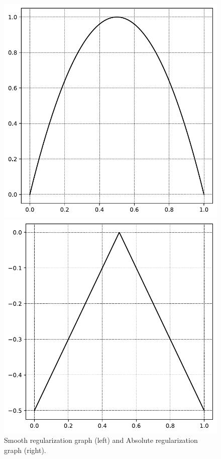 \begin{figure}[H]
    \centering
    \begin{minipage}{0.49\linewidth}
        \centering
        \includegraphics[width=\linewidth]{images/regularization/smooth_regularizer_graph.pdf}
    \end{minipage}%
    \begin{minipage}{0.49\linewidth}
        \centering
        \includegraphics[width=\linewidth]{images/regularization/abs_regularizer_graph.pdf}
    \end{minipage}
    \caption{Smooth regularization graph (left) and Absolute regularization graph (right).}
    \label{fig:regularization}
\end{figure}

